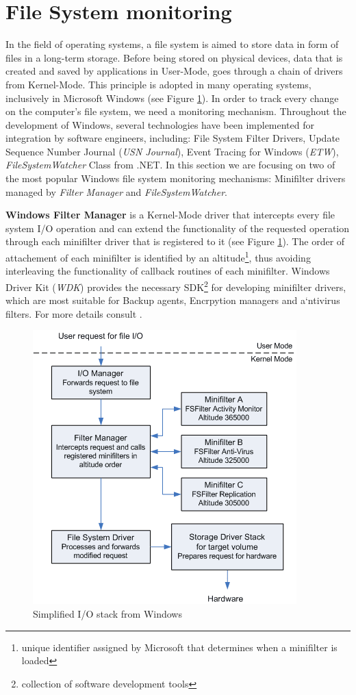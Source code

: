 \section{File System monitoring}
\label{section:filesystem}
In the field of operating systems, a file system is aimed to store data in form of files in a long-term storage. Before being stored on physical devices, data that is created and saved by applications in User-Mode, goes through a chain of drivers from Kernel-Mode. This principle is adopted in many operating systems, inclusively in Microsoft Windows (see Figure \ref{filterDriver}). In order to track every change on the computer's file system, we need a monitoring mechanism. Throughout the development of Windows, several technologies have been implemented for integration by software engineers, including: File System Filter Drivers, Update Sequence Number Journal (\textit{USN Journal}), Event Tracing for Windows (\textit{ETW}), \textit{FileSystemWatcher} Class from .NET. In this section we are focusing on two of the most popular Windows file system monitoring mechanisms: Minifilter drivers managed by \textit{Filter Manager} and \textit{FileSystemWatcher}. \par
\textbf{Windows Filter Manager} is a Kernel-Mode driver that intercepts every file system I/O operation and can extend the functionality of the requested operation through each minifilter driver that is registered to it (see Figure \ref{filterDriver}). The order of attachement of each minifilter is identified by an altitude\footnote{unique identifier assigned by Microsoft that determines when a minifilter is loaded}, thus avoiding interleaving the functionality of callback routines of each minifilter. Windows Driver Kit (\textit{WDK}) provides the necessary SDK\footnote{collection of software development tools} for developing minifilter drivers, which are most suitable for Backup agents, Encrpytion managers and a`ntivirus filters. For more details consult \cite{msdn}. \par

\begin{figure}[H]
	\centerline{\includegraphics[scale=0.6]{figures/filterDriver.png}}  
	\caption{Simplified I/O stack from Windows \cite{msdn}}
	\label{filterDriver}
\end{figure}


